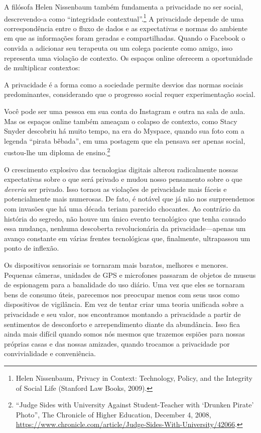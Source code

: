 \documentclass{book}
\begin{document}
A filósofa Helen Nissenbaum também fundamenta a privacidade no ser social,
descrevendo-a como ``integridade contextual''.\footnote{Helen Nissenbaum, Privacy
in Context: Technology, Policy, and the Integrity of Social Life (Stanford Law
Books, 2009).} A privacidade depende de uma correspondência entre o fluxo de dados
e as expectativas e normas do ambiente em que as informações foram geradas e
compartilhadas. Quando o Facebook o convida a adicionar seu terapeuta ou um colega
paciente como amigo, isso representa uma violação de contexto. Os espaços online
oferecem a oportunidade de multiplicar contextos:

\vspace{1cm}
A privacidade é a forma como a sociedade permite desvios das normas sociais
predominantes, considerando que o progresso social requer experimentação social.
\vspace{1cm}

Você pode ser uma pessoa em sua conta do Instagram e outra na sala de aula. Mas
os espaços online também ameaçam o colapso de contexto, como Stacy Snyder
descobriu há muito tempo, na era do Myspace, quando sua foto com a legenda
``pirata bêbada'', em uma postagem que ela pensava ser apenas social, custou-lhe 
um diploma de ensino.\footnote{``Judge Sides with University Against Student-Teacher
with ‘Drunken Pirate’ Photo'', The Chronicle of Higher Education, December 4,
2008, \url{https://www.chronicle.com/article/Judge-Sides-With-University/42066}.}

O crescimento explosivo das tecnologias digitais alterou radicalmente nossas
expectativas sobre o que será privado e mudou nosso pensamento sobre o que
\emph{deveria} ser privado. Isso tornou as violações de privacidade mais fáceis e 
potencialmente mais numerosas. De fato, é notável que já não nos surpreendemos
com invasões que há uma década teriam parecido chocantes. Ao contrário da
história do segredo, não houve um único evento tecnológico que tenha causado
essa mudança, nenhuma descoberta revolucionária da privacidade---apenas um
avanço constante em várias frentes tecnológicas que, finalmente, ultrapassou
um ponto de inflexão.

Os dispositivos sensoriais se tornaram mais baratos, melhores e menores.
Pequenas câmeras, unidades de GPS e microfones passaram de objetos de museus
de espionagem para a banalidade do uso diário. Uma vez que eles se tornaram
bens de consumo úteis, parecemos nos preocupar menos com seus usos como
dispositivos de vigilância. Em vez de tentar criar uma teoria unificada sobre
a privacidade e seu valor, nos encontramos montando a privacidade a partir de
sentimentos de desconforto e arrependimento diante da abundância. Isso fica
ainda mais difícil quando somos nós mesmos que trazemos espiões para nossas
próprias casas e das nossas amizades, quando trocamos a privacidade por
convivialidade e conveniência.
\end{document}
